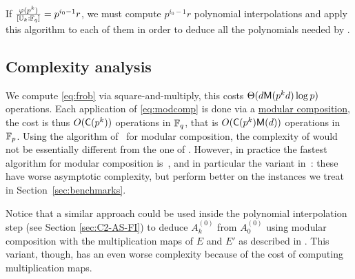 If $\frac{\varphi(p^k)}{[\mathbb{U}_k:\mathbb{F}_q]} = p^{i_0-1}r$, we must compute
$p^{i_0-1}r$ polynomial interpolations and apply this algorithm to
each of them in order to deduce all the polynomials needed by \ctwo{}.


\subsection{Complexity analysis}
We compute \eqref{eq:frob} via square-and-multiply, this costs
$\Theta(d\mathsf{M}(p^kd)\log p)$ operations. Each application of
\eqref{eq:modcomp} is done via a
\hyperref[sec:modular-composition]{modular composition}, the cost is
thus $O(\mathsf{C}(p^k))$ operations in $\mathbb{F}_q$, that is
$O(\mathsf{C}(p^k)\mathsf{M}(d))$ operations in $\mathbb{F}_p$. Using the algorithm
of~\cite{kedlaya+umans08} for modular composition, the complexity of
\ctwoasfimc{} would not be essentially different from the one of
\ctwoasfi{}. However, in practice the fastest algorithm for modular
composition is~\cite{brent+kung}, and in particular the variant
in~\cite[Lemma~3]{kaltofen+shoup98}: these have worse asymptotic
complexity, but perform better on the instances we treat in
Section~\ref{sec:benchmarks}.

Notice that a similar approach could be used inside the polynomial
interpolation step (see Section \ref{sec:C2-AS-FI}) to deduce
$A_k^{(0)}$ from $A_0^{(0)}$ using modular composition with the
multiplication maps of $E$ and $E'$ as described in
\cite[$\S$2.3]{couveignes96}. This variant, though, has an even worse
complexity because of the cost of computing multiplication maps.




%
